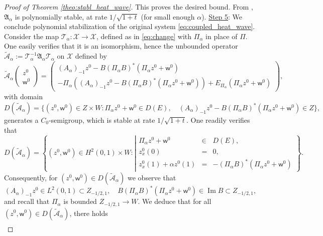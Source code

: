\documentclass[10pt]{article}
\newcommand{\opIm}{\operatorname{Im}}
\begin{document}
\begin{proof}[Proof of Theorem \ref{theo:stabl_heat_wave}]
This proves the desired bound. From \cite[Theorem 2.4]{borichev_tomilov}, $\mathfrak{A}_\alpha$ is polynomially stable, at rate $1/\sqrt{1+t}$ (for small enough $\alpha$). 
\newline
\newline
\underline{Step 5}: We conclude polynomial stabilization of the original system \eqref{eq:coupled_heat_wave}.
\newline
\newline
Consider the map $\mathcal{T}_\alpha : \mathcal{X} \to \mathcal{X}$, defined as in \eqref{eq:change} with $\Pi_\alpha$ in place of $\Pi$. One easily verifies that it is an isomorphism, hence the unbounded operator $\tilde{\mathcal{A}}_\alpha := \mathcal{T}_\alpha^{-1} \mathfrak{A}_\alpha \mathcal{T}_\alpha$ on $\mathcal{X}$ defined by 
\[
\tilde{\mathcal{A}}_\alpha \left( \begin{array}{c}
z^0 \\ \mathsf{w}^0 \end{array} \right) = \left( \begin{array}{cc}
    (A_\alpha)_{-1} z^0 - B(\Pi_\alpha B)^* (\Pi_\alpha z^0 + \mathsf{w}^0) \\
    -\Pi_\alpha \left( (A_\alpha)_{-1} z^0 - B(\Pi_\alpha B)^* (\Pi_\alpha z^0 + \mathsf{w}^0) \right) + E_{\Pi_\alpha} (\Pi_\alpha z^0 + \mathsf{w}^0)
\end{array}\right),
\]
with domain 
\[
D(\tilde{\mathcal{A}}_\alpha) = \{ (z^0,\mathsf{w}^0) \in Z \times W : \Pi_\alpha z^0 + \mathsf{w}^0 \in D(E),\quad (A_\alpha)_{-1}z^0 - B(\Pi_\alpha B)^*(\Pi_\alpha z^0 + \mathsf{w}^0) \in Z \},
\]
generates a $C_0$-semigroup, which is stable at rate $1/\sqrt{1+t}$. One readily verifies that 
\[
D(\tilde{\mathcal{A}}_\alpha) = \left\lbrace (z^0,\mathsf{w}^0) \in H^2(0,1) \times W : \left| \begin{array}{rcl}
\Pi_\alpha z^0 + \mathsf{w}^0 &\in& D(E), \\
z_x^0(0) &=& 0, \\
z_x^0(1) + \alpha z^0(1) &=& -(\Pi_\alpha B)^*(\Pi_\alpha z^0 + \mathsf{w}^0)
\end{array}\right. \right\rbrace.
\]
Consequently, for $(z^0,\mathsf{w}^0) \in D(\tilde{\mathcal{A}}_\alpha)$ we observe that 
\[
(A_\alpha)_{-1} z^0 \in L^2(0,1)\subset Z_{-1/2,1},\quad B(\Pi_\alpha B)^* (\Pi_\alpha z^0 + \mathsf{w}^0) \in \opIm B \subset Z_{-1/2,1},
\]
and recall that $\Pi_\alpha$ is bounded $Z_{-1/2,1} \to W$. We deduce that for all $(z^0,\mathsf{w}^0) \in D(\tilde{\mathcal{A}}_\alpha)$, there holds 
\begin{align*}

\end{align*}
\end{proof}
\end{document}
